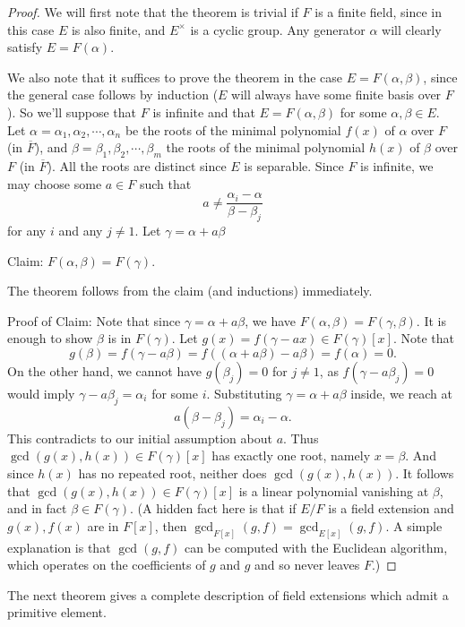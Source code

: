 \documentclass[12pt]{report}
\theoremstyle{definition}
\def\aa{\alpha}
\def\bb{\beta}
\begin{document}
\begin{proof}
    We will first note that the theorem is trivial if $F$ is a finite field, since in this case $E$ is also finite, and $E^\times$ is a cyclic group. Any generator $\aa$ will clearly satisfy $E = F(\aa)$.

    We also note that it suffices to prove the theorem in the case $E = F(\aa,\bb)$, since the general case follows by induction ($E$ will always have some finite basis over $F$). So we'll suppose that $F$ is infinite and that $E=F(\aa,\bb)$ for some $\aa,\bb\in E$.
    Let $\aa=\aa_1,\aa_2,\cdots,\aa_n$ be the roots of the minimal polynomial $f(x)$ of $\aa$ over $F$ (in $\overline{F}$), and $\bb=\bb_1,\bb_2,\cdots,\bb_m$ the roots of the minimal polynomial $h(x)$ of $\bb$ over $F$ (in $\overline{F}$). All the roots are distinct since $E$ is separable. Since $F$ is infinite, we may choose some $a \in F$ such that $$a\not= \frac{\aa_i-\aa}{\bb-\bb_j}$$ for any $i$ and any $j \not= 1$. Let $\gamma = \aa+a\bb$

    Claim: $F(\aa,\bb)=F(\gamma)$.

    The theorem follows from the claim (and inductions) immediately.

    Proof of Claim: Note that since $\gamma = \aa+a\bb$, we have $F(\aa,\bb)=F(\gamma,\beta)$. It is enough to show $\beta$ is in $F(\gamma)$. Let $g(x) = f(\gamma - ax) \in F(\gamma)[x]$. Note that 
    $$g(\beta) =f(\gamma - a \beta) = f((\aa+a\bb)-a\bb) = f(\aa) = 0.$$
    On the other hand, we cannot have $g(\beta_j)=0$ for $j \not=1$, as $f(\gamma - a\beta_j)=0$ would imply $\gamma-a\beta_j=\aa_i$ for some $i$. Substituting $\gamma= \aa+a\bb$ inside, we reach at
     $$a(\bb-\bb_j)=\aa_i-\aa.$$
    This contradicts to our initial assumption about $a$. Thus $\gcd(g(x), h(x))\in F(\gamma)[x]$ has exactly one root, namely $x =\beta$. And since $h(x)$ has no repeated root, neither does $\gcd(g(x), h(x))$. It follows that $\gcd(g(x), h(x)) \in F(\gamma)[x]$ is a linear polynomial vanishing at $\beta$, and in fact $\beta \in F(\gamma)$. (A hidden fact here is that if $E/F$ is a field extension and $g(x),f(x)$ are in $F[x]$, then $\gcd_{F[x]}(g,f) = \gcd_{E[x]}(g,f)$. A simple explanation is that $\gcd(g,f)$ can be computed with the Euclidean algorithm, which operates on the coefficients of $g$ and $g$ and so never leaves $F$.)
\end{proof}

The next theorem gives a complete description of field extensions which admit a primitive
element.
\end{document}
